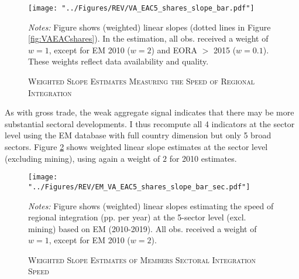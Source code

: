 \documentclass[a4paper]{article}
\begin{document}
\begin{figure}[h!] %
\centering
\caption{\label{fig:VAEACshares_bar}\textsc{Weighted Slope Estimates Measuring the Speed of Regional Integration}}
\texttt{[image: "../Figures/REV/VA\_EAC5\_shares\_slope\_bar.pdf"]} \\ 
\raggedright
\scriptsize
\emph{Notes:} Figure shows (weighted) linear slopes (dotted lines in Figure \ref{fig:VAEACshares}). In the estimation, all obs. received a weight of $w=1$, except for EM 2010 ($w=2$) and EORA $>$ 2015 ($w=0.1$). These weights reflect data availability and quality.  
\end{figure}
\FloatBarrier

As with gross trade, the weak aggregate signal indicates that there may be more substantial sectoral developments. I thus recompute all 4 indicators at the sector level using the EM database with full country dimension but only 5 broad sectors. Figure \ref{fig:VAEACshares_bar_sec} shows weighted linear slope estimates at the sector level (excluding mining), using again a weight of $2$ for 2010 estimates. 

\begin{figure}[h!] %
\centering
\caption{\label{fig:VAEACshares_bar_sec}\textsc{Weighted Slope Estimates of Members Sectoral Integration Speed}}
\texttt{[image: "../Figures/REV/EM\_VA\_EAC5\_shares\_slope\_bar\_sec.pdf"]} \\ \raggedright
\scriptsize
\emph{Notes:} Figure shows (weighted) linear slopes estimating the speed of regional integration (pp. per year) at the 5-sector level (excl. mining) based on EM (2010-2019). All obs. received a weight of $w=1$, except for EM 2010 ($w=2$).  
\vspace{-5mm}
\end{figure}
\FloatBarrier
\end{document}

